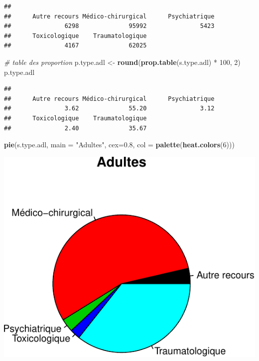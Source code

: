 \documentclass[]{article}
\newenvironment{Shaded}{\begin{snugshade}}{\end{snugshade}}
\newcommand{\KeywordTok}[1]{\textcolor[rgb]{0.13,0.29,0.53}{\textbf{{#1}}}}
\newcommand{\DataTypeTok}[1]{\textcolor[rgb]{0.13,0.29,0.53}{{#1}}}
\newcommand{\DecValTok}[1]{\textcolor[rgb]{0.00,0.00,0.81}{{#1}}}
\newcommand{\FloatTok}[1]{\textcolor[rgb]{0.00,0.00,0.81}{{#1}}}
\newcommand{\StringTok}[1]{\textcolor[rgb]{0.31,0.60,0.02}{{#1}}}
\newcommand{\CommentTok}[1]{\textcolor[rgb]{0.56,0.35,0.01}{\textit{{#1}}}}
\newcommand{\NormalTok}[1]{{#1}}
\begin{document}
\begin{verbatim}
## 
##      Autre recours Médico-chirurgical      Psychiatrique 
##               6298              95992               5423 
##      Toxicologique    Traumatologique 
##               4167              62025
\end{verbatim}

\begin{Shaded}
\begin{Highlighting}[]
\CommentTok{# table des proportion}
\NormalTok{p.type.adl <-}\StringTok{ }\KeywordTok{round}\NormalTok{(}\KeywordTok{prop.table}\NormalTok{(s.type.adl) *}\StringTok{ }\DecValTok{100}\NormalTok{, }\DecValTok{2}\NormalTok{)}
\NormalTok{p.type.adl}
\end{Highlighting}
\end{Shaded}

\begin{verbatim}
## 
##      Autre recours Médico-chirurgical      Psychiatrique 
##               3.62              55.20               3.12 
##      Toxicologique    Traumatologique 
##               2.40              35.67
\end{verbatim}

\begin{Shaded}
\begin{Highlighting}[]
\KeywordTok{pie}\NormalTok{(s.type.adl, }\DataTypeTok{main =} \StringTok{"Adultes"}\NormalTok{, }\DataTypeTok{cex=}\FloatTok{0.8}\NormalTok{, }\DataTypeTok{col =} \KeywordTok{palette}\NormalTok{(}\KeywordTok{heat.colors}\NormalTok{(}\DecValTok{6}\NormalTok{)))}
\end{Highlighting}
\end{Shaded}

\includegraphics{analyse_merge_files/figure-latex/adultes-1.pdf}\\
\end{document}
